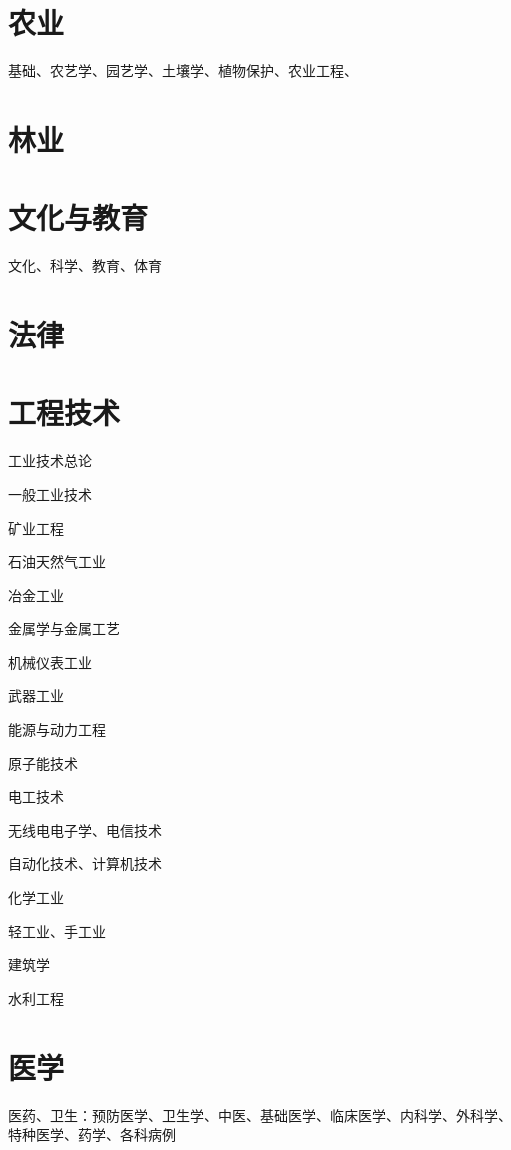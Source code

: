 \documentclass[UTF8]{ApplicationUniverse}
\begin{document}






\chapter{农业} %
基础、农艺学、园艺学、土壤学、植物保护、农业工程、



\chapter{林业} %




\chapter{文化与教育}
文化、科学、教育、体育



\chapter{法律} %


\chapter{工程技术} %
工业技术总论

一般工业技术

矿业工程

石油天然气工业

冶金工业

金属学与金属工艺

机械仪表工业

武器工业

能源与动力工程

原子能技术

电工技术

无线电电子学、电信技术

自动化技术、计算机技术

化学工业

轻工业、手工业

建筑学

水利工程








\chapter{医学} %
医药、卫生：预防医学、卫生学、中医、基础医学、临床医学、内科学、外科学、特种医学、药学、各科病例
\end{document}
